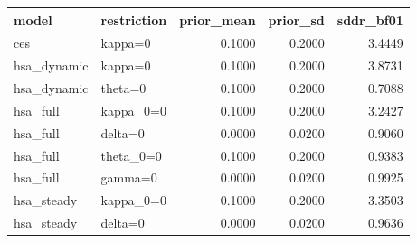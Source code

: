 \begin{tabular}{llrrr}
\toprule
model & restriction & prior\_mean & prior\_sd & sddr\_bf01 \\
\midrule
ces & kappa=0 & 0.1000 & 0.2000 & 3.4449 \\
hsa\_dynamic & kappa=0 & 0.1000 & 0.2000 & 3.8731 \\
hsa\_dynamic & theta=0 & 0.1000 & 0.2000 & 0.7088 \\
hsa\_full & kappa\_0=0 & 0.1000 & 0.2000 & 3.2427 \\
hsa\_full & delta=0 & 0.0000 & 0.0200 & 0.9060 \\
hsa\_full & theta\_0=0 & 0.1000 & 0.2000 & 0.9383 \\
hsa\_full & gamma=0 & 0.0000 & 0.0200 & 0.9925 \\
hsa\_steady & kappa\_0=0 & 0.1000 & 0.2000 & 3.3503 \\
hsa\_steady & delta=0 & 0.0000 & 0.0200 & 0.9636 \\
\bottomrule
\end{tabular}
